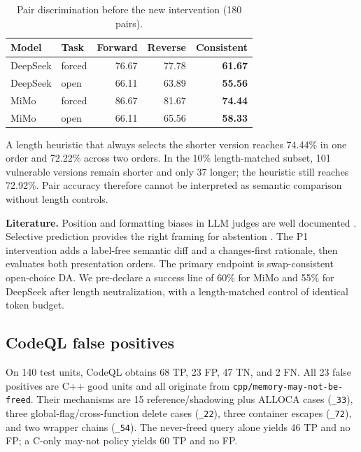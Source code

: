 \documentclass[conference]{IEEEtran}
\newcommand{\best}[1]{\textbf{#1}}
\begin{document}
\begin{table}[t]
\centering
\caption{Pair discrimination before the new intervention (180 pairs).}
\label{tab:pairbase}
\footnotesize
\setlength{\tabcolsep}{3pt}
\begin{tabular}{@{}llrrr@{}}
\toprule
Model & Task & Forward & Reverse & Consistent \\
\midrule
DeepSeek & forced & 76.67 & 77.78 & \best{61.67} \\
DeepSeek & open & 66.11 & 63.89 & \best{55.56} \\
MiMo & forced & 86.67 & 81.67 & \best{74.44} \\
MiMo & open & 66.11 & 65.56 & \best{58.33} \\
\bottomrule
\end{tabular}
\end{table}

A length heuristic that always selects the shorter version reaches 74.44\% in one order and 72.22\% across two orders. In the 10\% length-matched subset, 101 vulnerable versions remain shorter and only 37 longer; the heuristic still reaches 72.92\%. Pair accuracy therefore cannot be interpreted as semantic comparison without length controls.

\textbf{Literature.} Position and formatting biases in LLM judges are well documented \cite{shi2025judges,zhao2026bias}. Selective prediction provides the right framing for abstention \cite{chow1970,geifman2017selective,angelopoulos2021conformal}. The P1 intervention adds a label-free semantic diff and a changes-first rationale, then evaluates both presentation orders. The primary endpoint is swap-consistent open-choice DA. We pre-declare a success line of 60\% for MiMo and 55\% for DeepSeek after length neutralization, with a length-matched control of identical token budget.

\subsection{CodeQL false positives}
\label{sec:gap-codeql}

On 140 test units, CodeQL obtains 68 TP, 23 FP, 47 TN, and 2 FN. All 23 false positives are C++ good units and all originate from \texttt{cpp/memory-may-not-be-freed}. Their mechanisms are 15 reference/shadowing plus ALLOCA cases (\texttt{\_33}), three global-flag/cross-function delete cases (\texttt{\_22}), three container escapes (\texttt{\_72}), and two wrapper chains (\texttt{\_54}). The never-freed query alone yields 46 TP and no FP; a C-only may-not policy yields 60 TP and no FP.
\end{document}
